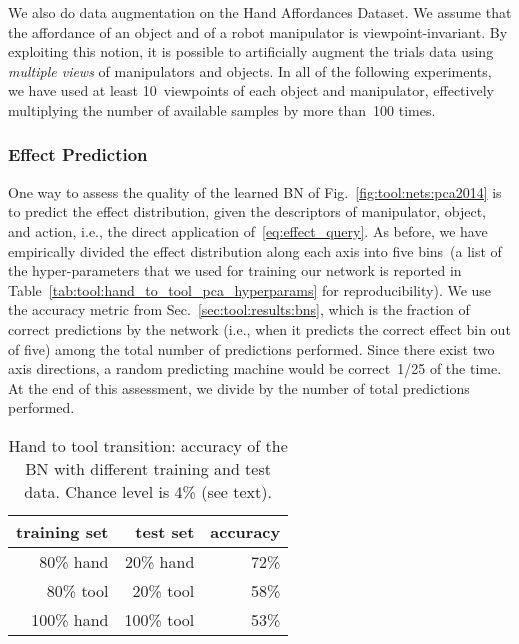 We also do data augmentation on the Hand Affordances Dataset.
We assume that the affordance of an object and of a robot manipulator is viewpoint-invariant.
By exploiting this notion, it is possible to artificially augment the trials data using \emph{multiple views} of manipulators and objects.
In all of the following experiments, we have used at least 10~viewpoints of each object and manipulator, effectively multiplying the number of available samples by more than~100 times.

\subsubsection{Effect Prediction}
\label{sec:tool:results:hand_to_tool:effect_prediction}

One way to assess the quality of the learned \ac{BN} of Fig.~\ref{fig:tool:nets:pca2014} is to predict the effect distribution, given the descriptors of manipulator, object, and action, i.e., the direct application of~\eqref{eq:effect_query}.
As before, we have empirically divided the effect distribution along each axis into five bins~(a list of the hyper-parameters that we used for training our network is reported in Table~\ref{tab:tool:hand_to_tool_pca_hyperparams} for reproducibility).
We use the accuracy metric from Sec.~\ref{sec:tool:results:bns}, which is the fraction of correct predictions by the network (i.e., when it predicts the correct effect bin out of five) among the total number of predictions performed.
Since there exist two axis directions, a random predicting machine would be correct~1/25 of the time.
At the end of this assessment, we divide by the number of total predictions performed.

\begin{table}
\caption[Hand to tool transition: accuracy of the \acl{BN} with different training and test data.]{Hand to tool transition: accuracy of the \acl{BN} with different training and test data. Chance level is 4\% (see text).}
\label{tab:tool:accuracy_hand_tool}
\centering
\begin{tabular}{*{3}{r}} %
\toprule
training set & test set   & accuracy \\
\midrule
80\% hand    & 20\% hand  & 72\% \\
80\% tool    & 20\% tool  & 58\% \\
100\% hand   & 100\% tool & 53\% \\
\bottomrule
\end{tabular}
\end{table}

